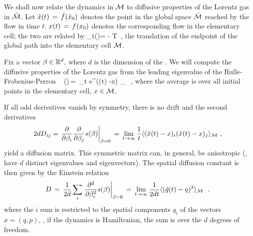 \documentclass[aps,pre,showpacs,preprint,groupedaddress,floatfix]{revtex4-1}
\begin{document}
We shall now relate the dynamics in ${\cal M}$ to diffusive properties of the Lorentz gas in $\hat {{\cal M}}$. Let $\hat x(t)\,=\,{\hat{f}^{}(\hat x_0)}$ denotes the point in the global space $\hat {{\cal M}}$ reached by the flow in time $t$. $x(t)\,=\,{f^{}({x_0})}$ denotes the corresponding flow in the elementary cell; the two are related by
\beq
\hn_t(\xInit)= \hflow{\xInit} - \flow{\xInit} \in T
\,,
the translation of the endpoint of the global path into the elementary cell $\pS$.

Fix a vector $\beta \in \reals^d$, where $d$ is the dimension of the {\statesp}. We will compute the diffusive properties of the Lorentz gas from the leading eigenvalue of the Rulle-Frobenius-Perron \evOper\
\beq
\eigenvL(\beta)\,=\, \lim_{t \rightarrow \infty}  \log
\langle e^{\beta \cdot (\hx(t) -x) } \rangle_\pS
~, \quad
{}
where the average is over all initial points in the elementary cell, $x \in \pS$. %

If all odd derivatives vanish by symmetry, there is no drift and the second derivatives
\[
2d D_{ij} =
\left . {{\partial} \over {\partial \beta_i}}
{{\partial} \over {\partial \beta_j}}
\eigenvL(\beta)\right |_{\beta=0} \,=\,\lim_{t\rightarrow \infty} {1\over t}
\langle {(\hx(t) -x)_i (\hx(t) -x)_j } \rangle_\pS ~,
\]
yield a diffusion matrix.  This symmetric matrix can, in general, be anisotropic (\ie, have $d$ distinct eigenvalues and eigen\-vectors). The spatial diffusion constant is then given by the Einstein relation
\[
D\,=\,{1\over 2 d} \sum_i
\left .{{\partial}^2 \over {\partial \beta^2_i}}
s(\beta)\right |_{\beta=0}
\,=\, \lim_{t\rightarrow \infty} {1\over{2d t}}
\langle {(\hat{q}(t) -q)^2 } \rangle_{{\cal M}}~
~,
\]
where the $i$ sum is restricted to the spatial components $q_i$ of the {\statesp} vectors $x=(q,p)$, \ie, if the dynamics is Hamiltonian, the sum is over the $d$ degrees of freedom.

\end{document}
